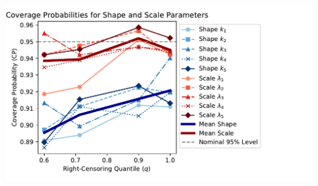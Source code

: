 \documentclass{article}
\begin{document}
\vspace{0.25mm}

\begin{center}
  \includegraphics[width=1\textwidth,height=0.33\textheight,keepaspectratio]{combined-cp.pdf}
\end{center}
\end{document}
